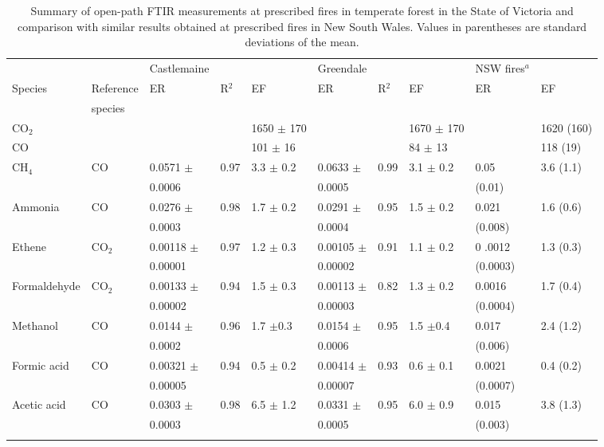 \documentclass[acp, manuscript]{copernicus}
\begin{document}
\begin{table} 
  \caption{Summary of open-path FTIR measurements at prescribed fires in temperate forest in the State of Victoria and comparison with similar results obtained at prescribed fires in New South Wales. Values in parentheses are standard deviations of the mean.}
 \begin{tabular}{l l l l l l l l l l  } 
   \tophline
   & & Castlemaine & & & Greendale & & & NSW fires$^a$ & \\
   Species & Reference &ER & R$^2$ & EF & ER & R$^2$ & EF &  ER & EF \\
   &species&&&&&&&&\\
   \hline
   CO$_2$ & & & & 1650 $\pm$ 170 & & & 1670 $\pm$ 170 & & 1620 (160) \\
   CO & & & & 101 $\pm$ 16 & & &84 $\pm$ 13 & & 118 (19) \\
   CH$_4$ & CO & 0.0571  $\pm$   & 0.97 & 3.3 $\pm$ 0.2 & 0.0633 $\pm$ & 0.99 & 3.1 $\pm$ 0.2 &  0.05  & 3.6 (1.1) \\
   & &0.0006& & & 0.0005 &  &&(0.01)&\\
   Ammonia & CO & 0.0276 $\pm$ & 0.98 & 1.7 $\pm$ 0.2 & 0.0291 $\pm$& 0.95 & 1.5 $\pm$ 0.2 & 0.021  & 1.6 (0.6)\\
    & &  0.0003& & & 0.0004 &  &&(0.008)&\\
   Ethene & CO$_2$ & 0.00118 $\pm$ & 0.97 & 1.2 $\pm$ 0.3 & 0.00105 $\pm$ & 0.91 & 1.1 $\pm$ 0.2 & 0
   .0012& 1.3 (0.3) \\
   & &  0.00001& & & 0.00002 &  &&(0.0003)&\\
   Formaldehyde & CO$_2$ & 0.00133 $\pm$ & 0.94 & 1.5 $\pm$ 0.3 & 0.00113 $\pm$& 0.82 & 1.3 $\pm$ 0.2 & 0.0016 & 1.7 (0.4) \\
   & &  0.00002& & & 0.00003 &  &&(0.0004)&\\
   Methanol & CO & 0.0144 $\pm$& 0.96 & 1.7 $\pm$0.3 & 0.0154 $\pm$& 0.95 & 1.5 $\pm$0.4 & 0.017 & 2.4 (1.2) \\
   & &  0.0002& & & 0.0006 &  &&(0.006)&\\
   Formic acid & CO & 0.00321 $\pm$& 0.94 & 0.5 $\pm$ 0.2 & 0.00414 $\pm$& 0.93 & 0.6 $\pm$ 0.1 & 0.0021 & 0.4 (0.2)\\
    & &  0.00005& & & 0.00007 &  &&(0.0007)&\\
   Acetic acid & CO & 0.0303 $\pm$ & 0.98 & 6.5 $\pm$ 1.2 & 0.0331 $\pm$& 0.95 & 6.0 $\pm$ 0.9 & 0.015 & 3.8 (1.3)\\
     & &  0.0003& & & 0.0005 &  &&(0.003)&\\
 \bottomhline
\end{tabular}
\label{table:OP}
\end{table}
\end{document}

